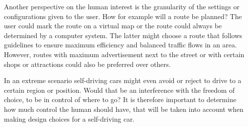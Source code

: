 Another perspective on the human interest is the granularity of the settings or configurations given to the user. How for example will a route be planned? The user could mark the route on a virtual map or the route could always be determined by a computer system. The latter might choose a route that follows guidelines to ensure maximum efficiency and balanced traffic flows in an area. However, routes with maximum advertisement next to the street or with certain shops or attractions could also be preferred over others. 

In an extreme scenario self-driving cars might even avoid or reject to drive to a certain region or position. Would that be an interference with the freedom of choice, to be in control of where to go? It is therefore important to determine how much control the human should have, that will be taken into account when making design choices for a self-driving car. 

